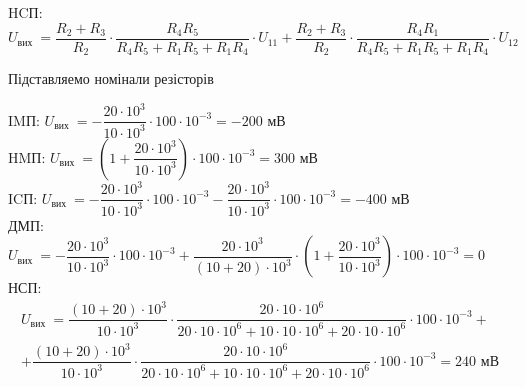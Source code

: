 \documentclass[a4paper,14pt]{extreport}
\begin{document}
HCП: \\

$U_{\text {вих }}=\dfrac{R_{2}+R_{3}}{R_{2}} \cdot \dfrac{R_{4} R_{5}}{R_{4} R_{5}+R_{1} R_{5}+R_{1} R_{4}} \cdot U_{11}+\dfrac{R_{2}+R_{3}}{R_{2}} \cdot \dfrac{R_{4} R_{1}}{R_{4} R_{5}+R_{1} R_{5}+R_{1} R_{4}} \cdot U_{12}$\\

\begin{center}Підставляемо номінали резісторів
\end{center}\par

IMП: $U_{\text {вих }}=-\dfrac{20 \cdot 10^{3}}{10 \cdot 10^{3}} \cdot 100 \cdot 10^{-3}=-200 \text{ мВ}$\\

HMП: $U_{\text {вих }}=\left(1+\dfrac{20 \cdot 10^{3}}{10 \cdot 10^{3}}\right) \cdot 100 \cdot 10^{-3}=300 \text{ мВ}$\\

ICП: $U_{\text {вих }}=-\dfrac{20 \cdot 10^{3}}{10 \cdot 10^{3}} \cdot 100 \cdot 10^{-3}-\dfrac{20 \cdot 10^{3}}{10 \cdot 10^{3}} \cdot 100 \cdot 10^{-3}=-400 \text{ мВ}$\\

ДМП: $U_{\text {вих }}=-\dfrac{20 \cdot 10^{3}}{10 \cdot 10^{3}} \cdot 100 \cdot 10^{-3}+\dfrac{20 \cdot 10^{3}}{(10+20) \cdot 10^{3}} \cdot\left(1+\dfrac{20 \cdot 10^{3}}{10 \cdot 10^{3}}\right) \cdot 100 \cdot 10^{-3}=0$\\



НСП: \begin{align*}
U_{\text {вих }}=\dfrac{(10+20) \cdot 10^{3}}{10 \cdot 10^{3}} \cdot \dfrac{20 \cdot 10 \cdot 10^{6}}{20 \cdot 10 \cdot 10^{6}+10 \cdot 10 \cdot 10^{6}+20 \cdot 10 \cdot 10^{6}} \cdot 100 \cdot 10^{-3}+\\
+\dfrac{(10+20) \cdot 10^{3}}{10 \cdot 10^{3}} \cdot \dfrac{20 \cdot 10 \cdot 10^{6}}{20 \cdot 10 \cdot 10^{6}+10 \cdot 10 \cdot 10^{6}+20 \cdot 10 \cdot 10^{6}} \cdot 100 \cdot 10^{-3}=240 \text{ мВ}
\end{align*}
\end{document}
